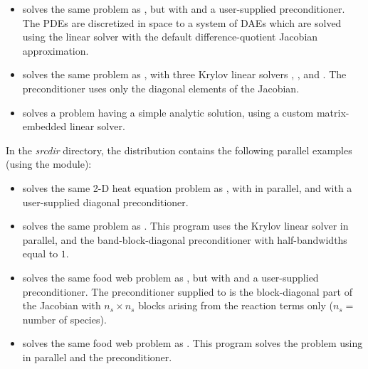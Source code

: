 \begin{itemize}
\item {}
  solves the same problem as , but with {\sunlinsolspgmr}
  and a user-supplied preconditioner.
  The PDEs are discretized in space to a system of DAEs which are solved
  using the {\sunlinsolband} linear solver with the default difference-quotient 
  Jacobian approximation.

\item {}
  solves the same problem as , with three Krylov linear solvers
  {\sunlinsolspgmr}, {\sunlinsolspbcgs}, and {\sunlinsolsptfqmr}.  The
  preconditioner uses only the diagonal elements of the Jacobian.

\item {} solves a problem having a simple analytic
  solution, using a custom matrix-embedded linear solver.


\end{itemize}

\vspace{0.2in}\noindent
In the {\em srcdir} directory, the {\ida} 
distribution contains the following parallel examples 
(using the {\nvecp} module):
\begin{itemize}

\item {}
  solves the same 2-D heat equation problem as , with
  {\sunlinsolspgmr} in parallel, and with a user-supplied diagonal preconditioner.
  
\item {}
  solves the same problem as .
  This program  uses the Krylov linear solver {\sunlinsolspgmr} in parallel, and the
  band-block-diagonal preconditioner {\idabbdpre} with half-bandwidths equal to $1$.

\item {}
  solves the same food web problem as , but with {\sunlinsolspgmr}
  and a user-supplied preconditioner.
  The preconditioner supplied to {\sunlinsolspgmr} is the block-diagonal part of 
  the Jacobian with $n_s \times n_s$ blocks arising from the reaction terms only
  ($n_s =$ number of species).

\item {}
  solves the same food web problem as .
  This program solves the problem using {\sunlinsolspgmr} in parallel and the
  {\idabbdpre} preconditioner.

\end{itemize}

